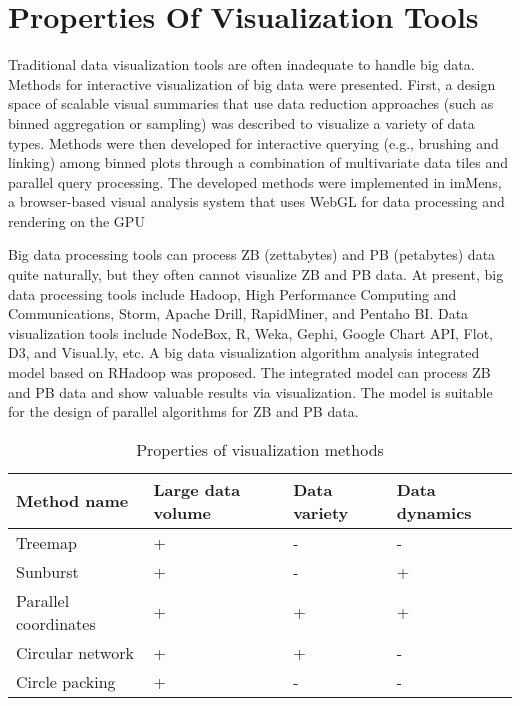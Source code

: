 \section{Properties Of Visualization Tools}
Traditional data visualization tools are often inadequate to handle big data. Methods for interactive visualization of big data were presented. First, a design space of scalable visual summaries that use data reduction approaches (such as binned aggregation or sampling) was described to visualize a variety of data types. Methods were then developed for interactive querying (e.g., brushing and linking) among binned plots through a combination of multivariate data tiles and parallel query processing. The developed methods were implemented in imMens, a browser-based visual analysis system that uses WebGL for data processing and rendering on the GPU
\par
Big data processing tools can process ZB (zettabytes) and PB (petabytes) data quite naturally, but they often cannot visualize ZB and PB data. At present, big data processing tools include Hadoop, High Performance Computing and Communications, Storm, Apache Drill, RapidMiner, and Pentaho BI. Data visualization tools include NodeBox, R, Weka, Gephi, Google Chart API, Flot, D3, and Visual.ly, etc. A big data visualization algorithm analysis integrated model based on RHadoop was proposed. The integrated model can process ZB and PB data and show valuable results via visualization. The model is suitable for the design of parallel algorithms for ZB and PB data.
\\
\begin{table}[h!]
\begin{tabular}[h!]{ |p{3cm}||p{3cm}|p{2cm}|p{2.5cm}|}
 \hline
 Method name&Large data volume&Data variety&Data dynamics\\
 \hline
 Treemap&+&-&-\\
 Sunburst&+&-&+\\
 Parallel coordinates&+&+&+\\
 Circular network &+&+&-\\
 Circle packing&+&-&-\\
 \hline
\end{tabular}
\caption{Properties of visualization methods}
\label{table:1}
\end{table}
